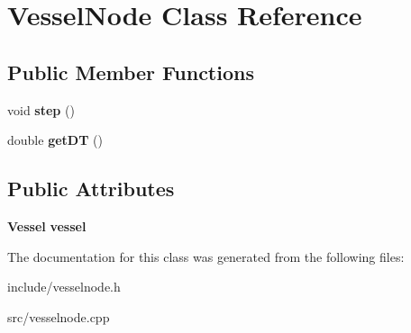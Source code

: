 \section{Vessel\+Node Class Reference}
\label{class_vessel_node}
\subsection*{Public Member Functions}
\begin{DoxyCompactItemize}
\item 
void {\bfseries step} ()\label{class_vessel_node_a3441573289fe061665c8d4b32a9445c7}

\item 
double {\bfseries get\+DT} ()\label{class_vessel_node_a471b1ea921f3baccc95ffb7a0b7f6db3}

\end{DoxyCompactItemize}
\subsection*{Public Attributes}
\begin{DoxyCompactItemize}
\item 
{\bf Vessel} {\bfseries vessel}\label{class_vessel_node_a2096cf24b7129b8011be9e0b101e6e7c}

\end{DoxyCompactItemize}


The documentation for this class was generated from the following files\+:\begin{DoxyCompactItemize}
\item 
include/vesselnode.\+h\item 
src/vesselnode.\+cpp\end{DoxyCompactItemize}
